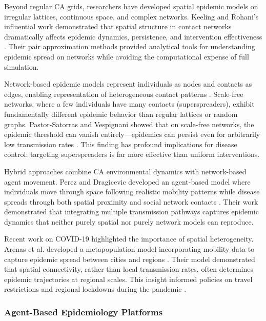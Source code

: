 Beyond regular CA grids, researchers have developed spatial epidemic models on irregular lattices, continuous space, and complex networks. Keeling and Rohani's influential work demonstrated that spatial structure in contact networks dramatically affects epidemic dynamics, persistence, and intervention effectiveness \cite{keeling2002spatial,keeling2005networks}. Their pair approximation methods provided analytical tools for understanding epidemic spread on networks while avoiding the computational expense of full simulation.

Network-based epidemic models represent individuals as nodes and contacts as edges, enabling representation of heterogeneous contact patterns \cite{pastor2015epidemic}. Scale-free networks, where a few individuals have many contacts (superspreaders), exhibit fundamentally different epidemic behavior than regular lattices or random graphs. Pastor-Satorras and Vespignani showed that on scale-free networks, the epidemic threshold can vanish entirely---epidemics can persist even for arbitrarily low transmission rates \cite{pastor2001epidemic}. This finding has profound implications for disease control: targeting superspreaders is far more effective than uniform interventions.

Hybrid approaches combine CA environmental dynamics with network-based agent movement. Perez and Dragicevic developed an agent-based model where individuals move through space following realistic mobility patterns while disease spreads through both spatial proximity and social network contacts \cite{perez2009agent}. Their work demonstrated that integrating multiple transmission pathways captures epidemic dynamics that neither purely spatial nor purely network models can reproduce.

Recent work on COVID-19 highlighted the importance of spatial heterogeneity. Arenas et al. developed a metapopulation model incorporating mobility data to capture epidemic spread between cities and regions \cite{arenas2020mathematical}. Their model demonstrated that spatial connectivity, rather than local transmission rates, often determines epidemic trajectories at regional scales. This insight informed policies on travel restrictions and regional lockdowns during the pandemic \cite{chinazzi2020effect}.

\subsubsection{Agent-Based Epidemiology Platforms}

